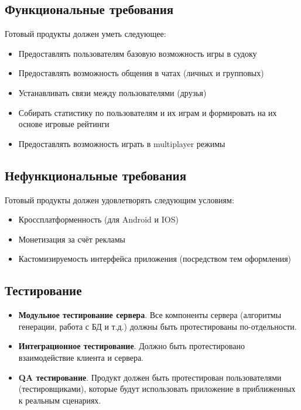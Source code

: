 \documentclass{article}
\begin{document}
\subsection*{Функциональные требования}

Готовый продукты должен уметь следующее:

\begin{itemize}
    \item Предоставлять пользователям базовую возможность игры в судоку
    \item Предоставлять возможность общения в чатах (личных и групповых)
    \item Устанавливать связи между пользователями (друзья)
    \item Собирать статистику по пользователям и их играм и формировать на их основе игровые рейтинги
    \item Предоставлять возможность играть в multiplayer режимы
\end{itemize}

\subsection*{Нефункциональные требования}

Готовый продукты должен удовлетворять следующим условиям:

\begin{itemize}
    \item Кроссплатформенность (для Android и IOS)
    \item Монетизация за счёт рекламы
    \item Кастомизируемость интерфейса приложения (посредством тем оформления)
\end{itemize}

\subsection*{Тестирование}

\begin{itemize}
    \item \textbf{Модульное тестирование сервера}. Все компоненты сервера (алгоритмы генерации, работа с БД и т.д.) должны быть протестированы по-отдельности.
    \item \textbf{Интеграционное тестирование}. Должно быть протестировано взаимодействие клиента и сервера.
    \item \textbf{QA тестирование}. Продукт должен быть протестирован пользователями (тестировщиками), которые будут использовать приложение в приближенных к реальным сценариях.
\end{itemize}
\end{document}
